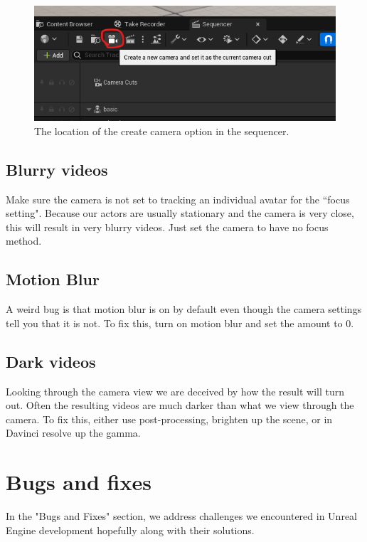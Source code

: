 \documentclass{uva-inf-article}
\begin{document}
\begin{figure}[hbt!]
    \centering
    \includegraphics[width=.9\textwidth]{imgs/addcamera.png}
    \caption{The location of the create camera option in the sequencer.}
    \label{fig:createCam}
\end{figure}

\subsection{Blurry videos}
Make sure the camera is not set to tracking an individual avatar for the ``focus setting". Because our actors are usually stationary and the camera is very close, this will result in very blurry videos. Just set the camera to have no focus method.

\subsection{Motion Blur}
A weird bug is that motion blur is on by default even though the camera settings tell you that it is not. To fix this, turn on motion blur and set the amount to 0.

\subsection{Dark videos}
Looking through the camera view we are deceived by how the result will turn out. Often the resulting videos are much darker than what we view through the camera. To fix this, either use post-processing, brighten up the scene, or in Davinci resolve up the gamma.


\section{Bugs and fixes}
In the "Bugs and Fixes" section, we address challenges we encountered in Unreal Engine development hopefully along with their solutions.
\end{document}
